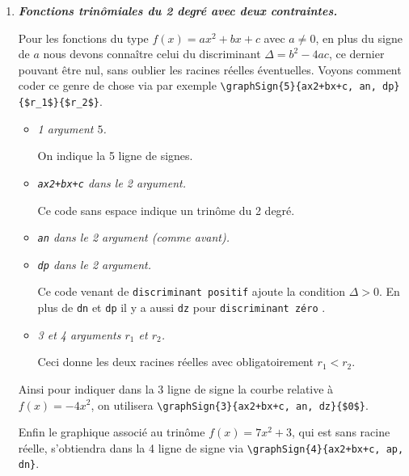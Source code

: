 \documentclass[12pt,a4paper]{book}
\theoremstyle{definition}
\newcommand\prefix[1]{%
	\texttt{#1}%
}
\begin{document}
{{\begin{enumerate}


    \bigskip
    \item \textbf{\itshape Fonctions trinômiales du 2\ieme{} degré avec deux contraintes.}
          
          \smallskip

          Pour les fonctions du type $f(x) = a x^2 + b x + c$ avec $a \neq 0$, en plus du signe de $a$ nous devons connaître celui du discriminant $\Delta = b^2 - 4ac$, ce dernier pouvant être nul, sans oublier les racines réelles éventuelles.
		  Voyons comment coder ce genre de chose via par exemple \verb#\graphSign{5}{ax2+bx+c, an, dp}{$r_1$}{$r_2$}#.
          \begin{itemize}[label=\small\textbullet, itemsep=.25em]
          		\item \textit{1\ier{} argument $5$.}

		              \smallskip
		              On indique la 5\ieme{} ligne de signes.

          		\item \textit{\texttt{ax2+bx+c} dans le 2\ieme{} argument.}

		              \smallskip
		              Ce code sans espace indique un trinôme du 2\ieme{} degré.


          		\item \textit{\texttt{an} dans le 2\ieme{} argument \emph{(comme avant).}}


          		\item \textit{\texttt{dp} dans le 2\ieme{} argument.}

		              \smallskip
		              Ce code venant de \prefix{discriminant positif} ajoute la condition $\Delta > 0$.
		              En plus de \prefix{dn} et \prefix{dp} il y a aussi \prefix{dz} pour \prefix{discriminant zéro}.
		
		
				\item \textit{3\ieme{} et 4\ieme{} arguments $r_1$ et $r_2$.}

		              \smallskip
		              Ceci donne les deux racines réelles avec obligatoirement $r_1 < r_2$.
          \end{itemize}


          Ainsi pour indiquer dans la 3\ieme{} ligne de signe la courbe relative à $f(x) = - 4 x^2$, on utilisera \verb#\graphSign{3}{ax2+bx+c, an, dz}{$0$}#.


          \smallskip

          Enfin le graphique associé au trinôme $f(x) = 7 x^2 + 3$, qui est sans racine réelle, s'obtiendra dans la 4\ieme{} ligne de signe via \verb#\graphSign{4}{ax2+bx+c, ap, dn}#.



\end{enumerate}}}
\end{document}
